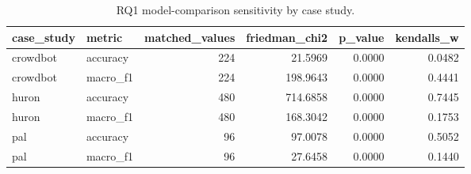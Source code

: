 \begin{table}[tbp]
\caption{RQ1 model-comparison sensitivity by case study.}
\label{tab:rq1_case_study_sensitivity}
\begin{tabular}{llrrrr}
\toprule
case\_study & metric & matched\_values & friedman\_chi2 & p\_value & kendalls\_w \\
\midrule
crowdbot & accuracy & 224 & 21.5969 & 0.0000 & 0.0482 \\
crowdbot & macro\_f1 & 224 & 198.9643 & 0.0000 & 0.4441 \\
huron & accuracy & 480 & 714.6858 & 0.0000 & 0.7445 \\
huron & macro\_f1 & 480 & 168.3042 & 0.0000 & 0.1753 \\
pal & accuracy & 96 & 97.0078 & 0.0000 & 0.5052 \\
pal & macro\_f1 & 96 & 27.6458 & 0.0000 & 0.1440 \\
\bottomrule
\end{tabular}
\end{table}
